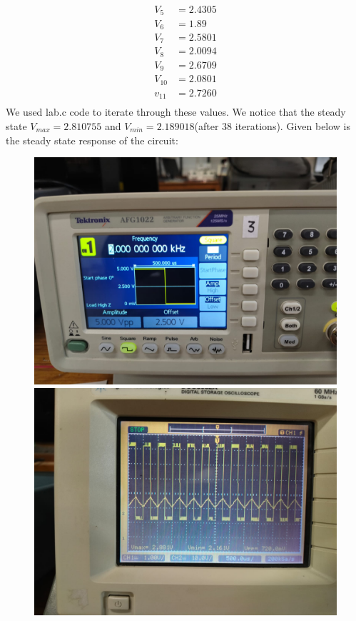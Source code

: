 \documentclass[a4paper,12pt]{article}
\begin{document}
\begin{align}
    V_5&=2.4305\\
    V_6&=1.89\\
    V_7&=2.5801\\
    V_8&=2.0094\\
    V_9&=2.6709\\
    V_{10}&=2.0801\\
    v_{11}&=2.7260\\
\end{align}
We used lab.c code to iterate through these values. We notice that the steady state $V_{max}=2.810755$ and $V_{min}=2.189018$(after 38 iterations).
Given below is the steady state response of the circuit:
\begin{figure}[h]
    \centering
    \begin{minipage}{0.45\textwidth}
        \centering
        \includegraphics[width=\textwidth]{figs/C2kpara.jpeg}
    \end{minipage}\hfill
    \begin{minipage}{0.45\textwidth}
        \centering
        \includegraphics[width=\textwidth]{figs/C2kplot.jpeg}
    \end{minipage}
\end{figure}
\end{document}
